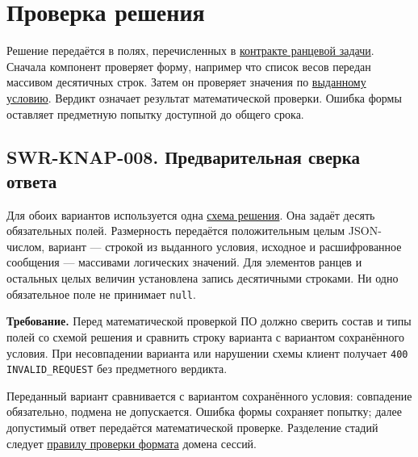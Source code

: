 \documentclass[12pt,a4paper]{article}
\begin{document}
\section{Проверка решения}\label{4-ux43fux440ux43eux432ux435ux440ux43aux430-ux440ux435ux448ux435ux43dux438ux44f}

\hypertarget{4-проверка-решения}{}

Решение передаётся в полях, перечисленных в {\href{DOC-06.2\_Сессии\_задач\_и\_планировщик.pdf\#ранцевая-задача}{контракте ранцевой задачи}}. Сначала компонент проверяет форму, например что список весов передан массивом десятичных строк. Затем он проверяет значения по {\hyperlink{условие-и-его-состав}{выданному условию}}. Вердикт означает результат математической проверки. Ошибка формы оставляет предметную попытку доступной до общего срока.

\subsection{SWR-KNAP-008. Предварительная сверка ответа}\label{swr-knap-008-ux43fux440ux435ux434ux432ux430ux440ux438ux442ux435ux43bux44cux43dux430ux44f-ux441ux432ux435ux440ux43aux430-ux43eux442ux432ux435ux442ux430}

\hypertarget{swr-knap-008-предварительная-сверка-ответа}{}

\hypertarget{swr-knap-008}{}

Для обоих вариантов используется одна {\href{DOC-06.2\_Сессии\_задач\_и\_планировщик.pdf\#ранцевая-задача}{схема решения}}. Она задаёт десять обязательных полей. Размерность передаётся положительным целым JSON-числом, вариант --- строкой из выданного условия, исходное и расшифрованное сообщения --- массивами логических значений. Для элементов ранцев и остальных целых величин установлена запись десятичными строками. Ни одно обязательное поле не принимает \texttt{null}.

\textbf{Требование.} Перед математической проверкой ПО должно сверить состав и типы полей со схемой решения и сравнить строку варианта с вариантом сохранённого условия. При несовпадении варианта или нарушении схемы клиент получает \texttt{400 INVALID\_\allowbreak{}REQUEST} без предметного вердикта.

Переданный вариант сравнивается с вариантом сохранённого условия: совпадение обязательно, подмена не допускается. Ошибка формы сохраняет попытку; далее допустимый ответ передаётся математической проверке. Разделение стадий следует {\href{DOC-06.2\_Сессии\_задач\_и\_планировщик.pdf\#swr-ses-009-проверка-формата}{правилу проверки формата}} домена сессий.
\end{document}
